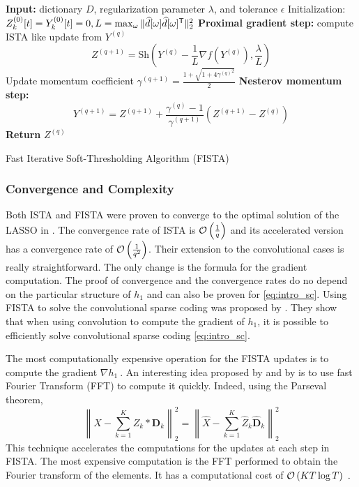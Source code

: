 \documentclass[../thesis.tex]{subfiles}
\begin{document}
\begin{algorithm}[t]
	\begin{algorithmic}[1]

		\STATE \textbf{Input: } dictionary $D$, regularization parameter $\lambda$,
							 and tolerance $\epsilon$
		\STATE Initialization: $Z^{(0)}_k[t] = Y^{(0)}_k[t] = 0,
			   L = \max_{\omega} \|\widehat d[\omega]\widehat d[\omega]^\mathsf{T}\|_2^2$
		\REPEAT
		\STATE \textbf{Proximal gradient step:} compute ISTA like update from $Y^{(q)}$ 
		\[
			Z^{(q+1)}=  \text{Sh}\left(Y^{(q)} - \frac{1}{L}\nabla f(Y^{(q)}),
									   \frac{\lambda}{L}\right)
		\]
		\STATE Update momentum coefficient
			$\displaystyle \gamma^{(q+1)} = \frac{1 + \sqrt{1 + 4{\gamma^{(q)}}^2}}{2}$
		\STATE \textbf{Nesterov momentum step:}
		\[
			Y^{(q+1)} =  Z^{(q+1)} + \frac{\gamma^{(q) }- 1}{\gamma^{(q+1)}}
											   \left(Z^{(q+1)} - Z^{(q)}\right)
		\]
		\STATE \textbf{Return} $Z^{(q)}$ 

	\end{algorithmic}
	\caption{Fast Iterative Soft-Thresholding Algorithm (FISTA)}
	\label{alg:fista}
\end{algorithm}


\subsubsection{Convergence and Complexity}
\label{ssub:cvg_fista}


	Both ISTA and FISTA were proven to converge to the optimal solution of the LASSO
	in \citet{Beck2009}. The convergence rate of ISTA is $\underset{}{\mathcal O}\left(\frac{1}{q}\right)$ and its
	accelerated version has a convergence rate of $\underset{}{\mathcal O}\left(\frac{1}{q^2}\right)$. Their extension
	to the convolutional cases is really straightforward. The only change is the formula
	for the gradient computation. The proof of convergence and the convergence rates
	do no depend on the particular structure of $h_1$ and can also be proven for
	\autoref{eq:intro_sc}. Using FISTA to solve the convolutional sparse coding
	was proposed by \citet{Chalasani2013}. They show that when using convolution to
	compute the gradient of $h_1$, it is possible to efficiently solve convolutional
	sparse coding \autoref{eq:intro_sc}.


	The most computationally expensive operation for the FISTA updates is to compute
	the gradient $\nabla h_1~.$ An interesting idea proposed by \citet{Wohlberg2016}
	and by \citet{Haeffele2017b}
	is to use fast Fourier Transform (FFT) to compute it quickly. Indeed, using the
	Parseval theorem,
	\begin{equation}
		\label{eq:fista_fft}
		\left\|X - \sum_{k=1}^KZ_k*{\pmb D}_k\right\|_2^2
			= \left\|\widehat X- \sum_{k=1}^K \widehat Z_k\widehat {\pmb D}_k \right\|_2^2
	\end{equation}
	This technique accelerates the computations for the updates at each step
	in FISTA. The most expensive computation is the FFT performed to obtain the
	Fourier transform of the elements. It has a computational cost of $\underset{}{\mathcal O}\left(KT\log T\right)~.$
\end{document}
